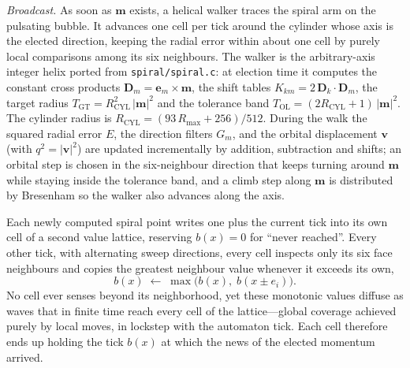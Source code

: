 \documentclass{ijuc}
\begin{document}
\emph{Broadcast.}  As soon as $\boldsymbol{m}$ exists, a helical walker traces the spiral arm on the pulsating bubble.  It advances one cell per tick around the cylinder whose axis is the elected direction, keeping the radial error within about one cell by purely local comparisons among its six neighbours.  The walker is the arbitrary-axis integer helix ported from \texttt{spiral/spiral.c}: at election time it computes the constant cross products $\boldsymbol{D}_{m}=\boldsymbol{e}_{m}\times\boldsymbol{m}$, the shift tables $K_{km}=2\,\boldsymbol{D}_{k}\cdot\boldsymbol{D}_{m}$, the target radius $T_{\mathrm{GT}}=R_{\mathrm{CYL}}^{2}\,|\boldsymbol{m}|^{2}$ and the tolerance band $T_{\mathrm{OL}}=(2R_{\mathrm{CYL}}+1)\,|\boldsymbol{m}|^{2}$.  The cylinder radius is $R_{\mathrm{CYL}}=(93\,R_{\max}+256)/512$.  During the walk the squared radial error $E$, the direction filters $G_{m}$, and the orbital displacement $\boldsymbol{v}$ (with $q^{2}=|\boldsymbol{v}|^{2}$) are updated incrementally by addition, subtraction and shifts; an orbital step is chosen in the six-neighbour direction that keeps turning around $\boldsymbol{m}$ while staying inside the tolerance band, and a climb step along $\boldsymbol{m}$ is distributed by Bresenham so the walker also advances along the axis.

Each newly computed spiral point writes one plus the current tick into its own cell of a second value lattice, reserving $b(x)=0$ for ``never reached''.  Every other tick, with alternating sweep directions, every cell inspects only its six face neighbours and copies the greatest neighbour value whenever it exceeds its own,
\[
b(x)\;\leftarrow\;\max\bigl(b(x),\;b(x\pm e_i)\bigr).
\]
No cell ever senses beyond its neighborhood, yet these monotonic values diffuse as waves that in finite time reach every cell of the lattice---global coverage achieved purely by local moves, in lockstep with the automaton tick.  Each cell therefore ends up holding the tick $b(x)$ at which the news of the elected momentum arrived.
\end{document}

